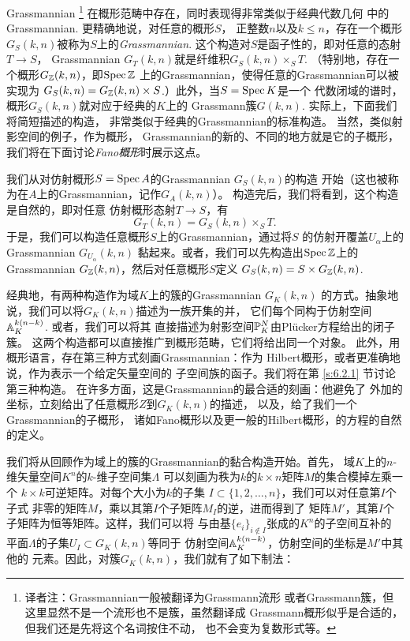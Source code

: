 Grassmannian%
\footnote{译者注：Grassmannian一般被翻译为Grassmann流形
或者Grassmann簇，但这里显然不是一个流形也不是簇，虽然翻译成
Grassmann概形似乎是合适的，但我们还是先将这个名词按住不动，
也不会变为复数形式等。}%
在概形范畴中存在，同时表现得非常类似于经典代数几何
中的Grassmannian. 更精确地说，对任意的概形$S$，
正整数$n$以及$k\leq n$，存在一个概形
$G_S(k,n)$被称为$S$上的\textit{Grassmannian}. 
这个构造对$S$是函子性的，即对任意的态射$T\to S$，
Grassmannian $G_T(k,n)$就是纤维积$G_S(k,n)\times_S T$. 
（特别地，存在一个概形$G_\zz(k,n)$，即$\spec \zz$
上的Grassmannian，使得任意的Grassmannian可以被实现为
$G_S(k,n)=G_\zz(k,n)\times S$.）此外，当$S=\spec K$是一个
代数闭域的谱时，概形$G_S(k,n)$就对应于经典的$K$上的
Grassmann簇$G(k,n)$. 实际上，下面我们将简短描述的构造，
非常类似于经典的Grassmannian的标准构造。%
当然，类似射影空间的例子，作为概形，
Grassmannian的新的、不同的地方就是它的子概形，
我们将在下面讨论\textit{Fano概形}时展示这点。

我们从对仿射概形$S=\spec A$的Grassmannian $G_S(k,n)$的构造
开始（这也被称为在$A$上的Grassmannian，记作$G_A(k,n)$）。
构造完后，我们将看到，这个构造是自然的，即对任意
仿射概形态射$T\to S$，有
\[
	G_T(k,n)=G_S(k,n)\times_S T.
\]
于是，我们可以构造任意概形$S$上的Grassmannian，通过将$S$
的仿射开覆盖$U_\alpha$上的Grassmannian $G_{U_\alpha}(k,n)$
黏起来。或者，我们可以先构造出$\spec\zz$上的Grassmannian
$G_{\zz}(k,n)$，然后对任意概形$S$定义
$G_S(k,n)=S\times G_\zz(k,n)$.

经典地，有两种构造作为域$K$上的簇的Grassmannian $G_K(k,n)$
的方式。抽象地说，我们可以将$G_K(k,n)$描述为一族开集的并，
它们每个同构于仿射空间$\A^{k(n-k)}_K$. 或者，我们可以将其
直接描述为射影空间$\P^N_K$由Pl\"{u}cker方程给出的闭子簇。
这两个构造都可以直接推广到概形范畴，它们将给出同一个对象。
此外，用概形语言，存在第三种方式刻画Grassmannian：作为
Hilbert概形，或者更准确地说，作为表示一个给定矢量空间的
子空间族的函子。我们将在第 \ref{s:6.2.1} 节讨论第三种构造。
在许多方面，这是Grassmannian的最合适的刻画：他避免了
外加的坐标，立刻给出了任意概形$Z$到$G_K(k,n)$的描述，
以及，给了我们一个Grassmannian的子概形，
诸如Fano概形以及更一般的Hilbert概形，的方程的自然的定义。

我们将从回顾作为域上的簇的Grassmannian的黏合构造开始。首先，
域$K$上的$n$-维矢量空间$K^n$的$k$-维子空间集$\Lambda$
可以刻画为秩为$k$的$k\times n$矩阵$M$的集合模掉左乘一个
$k\times k$可逆矩阵。对每个大小为$k$的子集
$I\subset \{1,2,\dots,n\}$，我们可以对任意第$I$个子式
非零的矩阵$M$，乘以其第$I$个子矩阵$M_I$的逆，进而得到了
矩阵$M'$，其第$I$个子矩阵为恒等矩阵。这样，我们可以将
与由基$\{e_i\}_{i\not\in I}$张成的$K^n$的子空间互补的
平面$\Lambda$的子集$U_I\subset G_K(k,n)$等同于
仿射空间$\A_K^{k(n-k)}$，仿射空间的坐标是$M'$中其他的
元素。因此，对簇$G_K(k,n)$，我们就有了如下制法：

